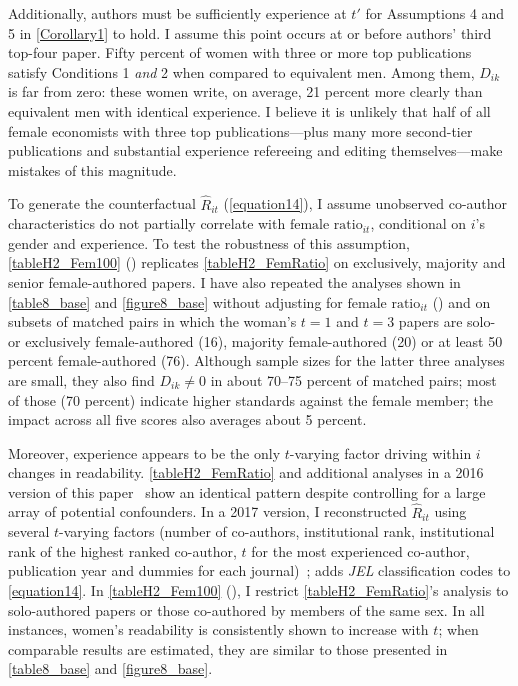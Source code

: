 \begin{appendices}
\begin{refsection}
Additionally, authors must be sufficiently experience at $t'$ for Assumptions 4 and 5 in \autoref{Corollary1} to hold. I assume this point occurs at or before authors' third top-four paper. Fifty percent of women with three or more top publications satisfy Conditions 1 \emph{and} 2 when compared to equivalent men. Among them, $D_{ik}$ is far from zero: these women write, on average, 21 percent more clearly than equivalent men with identical experience. I believe it is unlikely that half of all female economists with three top publications---plus many more second-tier publications and substantial experience refereeing and editing themselves---make mistakes of this magnitude.

To generate the counterfactual $\widehat R_{it}$ (\autoref{equation14}), I assume unobserved co-author characteristics do not partially correlate with $\text{female ratio}_{it}$, conditional on $i$'s gender and experience. To test the robustness of this assumption, \autoref{tableH2_Fem100} () replicates \autoref{tableH2_FemRatio} on exclusively, majority and senior female-authored papers. I have also repeated the analyses shown in \autoref{table8_base} and \autoref{figure8_base} without adjusting for $\text{female ratio}_{it}$ () and on subsets of matched pairs in which the woman's $t=1$ and $t=3$ papers are solo- or exclusively female-authored (16), majority female-authored (20) or at least 50 percent female-authored (76). Although sample sizes for the latter three analyses are small, they also find $D_{ik}\ne0$ in about 70--75 percent of matched pairs; most of those (70 percent) indicate higher standards against the female member; the impact across all five scores also averages about 5 percent.

Moreover, experience appears to be the only $t$-varying factor driving within $i$ changes in readability. \autoref{tableH2_FemRatio} and additional analyses in a 2016 version of this paper~\citep[][pp. 23--24]{Hengel2016} show an identical pattern despite controlling for a large array of potential confounders. In a 2017 version, I reconstructed $\widehat R_{it}$ using several $t$-varying factors (number of co-authors, institutional rank, institutional rank of the highest ranked co-author, $t$ for the most experienced co-author, publication year and dummies for each journal)~\citep[][pp. 30, 61]{Hengel2017};  adds \emph{JEL} classification codes to \autoref{equation14}. In \autoref{tableH2_Fem100} (), I restrict \autoref{tableH2_FemRatio}'s analysis to solo-authored papers or those co-authored by members of the same sex. In all instances, women's readability is consistently shown to increase with $t$; when comparable results are estimated, they are similar to those presented in \autoref{table8_base} and \autoref{figure8_base}.


\end{refsection}
\end{appendices}
